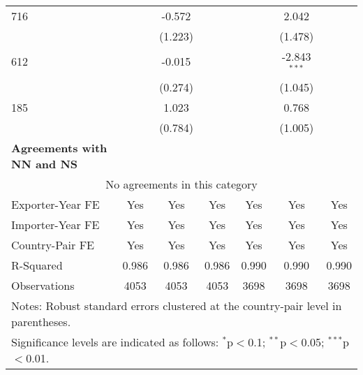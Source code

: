 \begin{table}[htbp]
\begin{adjustbox}{max width=\textwidth}
\begin{tabular}{lcccccc}
    716 &  & -0.572 &  &  & 2.042 &  \\
     &  & (1.223) &  &  & (1.478) &  \\
    612 &  & -0.015 &  &  & -2.843$^{\ast\ast\ast}$ &  \\
     &  & (0.274) &  &  & (1.045) &  \\
    185 &  & 1.023 &  &  & 0.768 &  \\
     &  & (0.784) &  &  & (1.005) &  \\
    \hline
    \textbf{Agreements with NN and NS} &  &  &  &  &  &  \\
    \hline
    \multicolumn{7}{c}{No agreements in this category} \\
    \hline
    Exporter-Year FE & Yes & Yes & Yes & Yes & Yes & Yes \\
    Importer-Year FE & Yes & Yes & Yes & Yes & Yes & Yes \\
    Country-Pair FE & Yes & Yes & Yes & Yes & Yes & Yes \\
    R-Squared & 0.986 & 0.986 & 0.986 & 0.990 & 0.990 & 0.990 \\
    Observations & 4053 & 4053 & 4053 & 3698 & 3698 & 3698 \\
    \hline
    \multicolumn{7}{l}{\footnotesize{Notes: Robust standard errors clustered at the country-pair level in parentheses.}} \\
    \multicolumn{7}{l}{\footnotesize{Significance levels are indicated as follows: $^{\ast}$p$<$0.1; $^{\ast\ast}$p$<$0.05; $^{\ast\ast\ast}$p$<$0.01.}} \\
    \end{tabular}
    \end{adjustbox}
\end{table}
